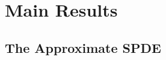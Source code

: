 \newcommand{\sfL}{\mathsf{L}}
\newcommand{\sfS}{\mathsf{S}}
\newcommand{\sfT}{\mathsf{T}}
\newcommand{\clG}{\mathcal{G}}
\newcommand{\clV}{\mathcal{V}}
\newcommand{\clZ}{\mathcal{Z}}
\newcommand{\EE}{\mathbb{E}}
\newcommand{\RR}{\mathbb{R}}
\newcommand{\Frob}{\mathrm{F}}
\newcommand{\dif}{\mathop{}\!\mathrm{d}}
\newcommand{\ttR}{\mathtt{R}}
\newcommand{\ttB}{\mathtt{B}}
\newcommand{\triplenorm}[1]{\lVert\!\lVert\!\lVert #1\rVert\!\rVert\!\rVert}

\section{Main Results}

\subsection{The Approximate SPDE}

